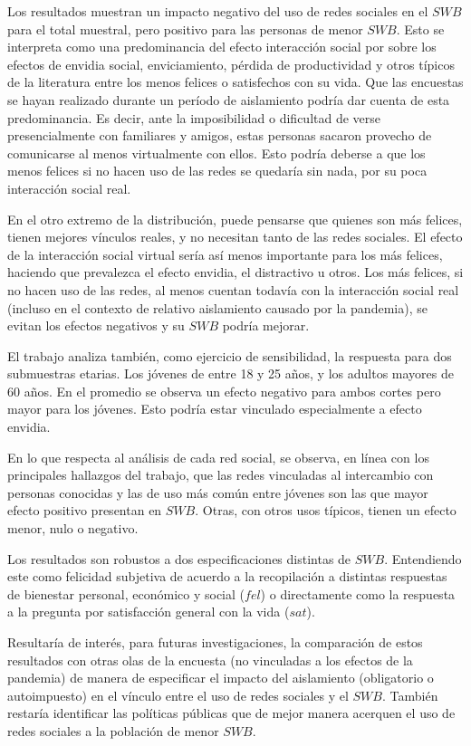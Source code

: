 \documentclass[11pt]{article}
\begin{document}
Los resultados muestran un impacto negativo del uso de redes sociales en el $SWB$ para el total muestral, pero positivo para las personas de menor $SWB$. Esto se interpreta como una predominancia del efecto interacción social por sobre los efectos de envidia social, enviciamiento, pérdida de productividad y otros típicos de la literatura entre los menos felices o satisfechos con su vida. Que las encuestas se hayan realizado durante un período de aislamiento podría dar cuenta de esta predominancia. Es decir, ante la imposibilidad o dificultad de verse presencialmente con familiares y amigos, estas personas sacaron provecho de comunicarse al menos virtualmente con ellos. Esto podría deberse a que los menos felices si no hacen uso de las redes se quedaría sin nada, por su poca interacción social real. 

En el otro extremo de la distribución, puede pensarse que quienes son más felices, tienen mejores vínculos reales, y no necesitan tanto de las redes sociales. El efecto de la interacción social virtual sería así menos importante para los más felices, haciendo que prevalezca el efecto envidia, el distractivo u otros. Los más felices, si no hacen uso de las redes, al menos cuentan todavía con la interacción social real (incluso en el contexto de relativo aislamiento causado por la pandemia), se evitan los efectos negativos y su $SWB$ podría mejorar. 

El trabajo analiza también, como ejercicio de sensibilidad, la respuesta para dos submuestras etarias. Los jóvenes de entre 18 y 25 años, y los adultos mayores de 60 años. En el promedio se observa un efecto negativo para ambos cortes pero mayor para los jóvenes. Esto podría estar vinculado especialmente a efecto envidia. 

En lo que respecta al análisis de cada red social, se observa, en línea con los principales hallazgos del trabajo, que las redes vinculadas al intercambio con personas conocidas y las de uso más común entre jóvenes son las que mayor efecto positivo presentan en $SWB$. Otras, con otros usos típicos, tienen un efecto menor, nulo o negativo. 

Los resultados son robustos a dos especificaciones distintas de $SWB$. Entendiendo este como felicidad subjetiva de acuerdo a la recopilación a distintas respuestas de bienestar personal, económico y social ($fel$) o directamente como la respuesta a la pregunta por satisfacción general con la vida ($sat$). 

Resultaría de interés, para futuras investigaciones, la comparación de estos resultados con otras olas de la encuesta (no vinculadas a los efectos de la pandemia) de manera de especificar el impacto del aislamiento (obligatorio o autoimpuesto) en el vínculo entre el uso de redes sociales y el $SWB$. También restaría identificar las políticas públicas que de mejor manera acerquen el uso de redes sociales a la población de menor $SWB$.
\end{document}
